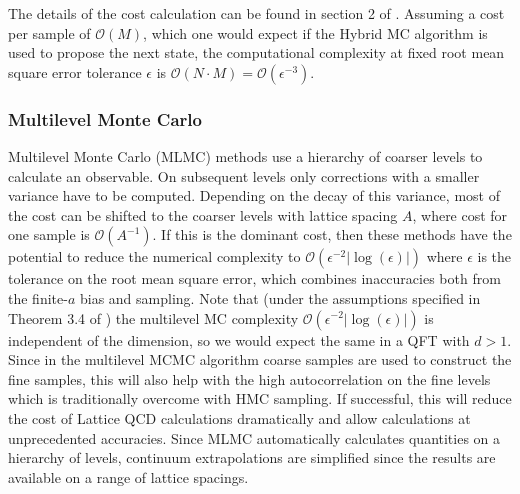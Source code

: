 \documentclass[11pt]{article}
\begin{document}
The details of the cost calculation can be found in section 2 of \cite{Dodwell2015}. Assuming a cost per sample of $\mathcal{O}(M)$, which one would expect if the Hybrid MC algorithm is used to propose the next state, the computational complexity at fixed root mean square error tolerance $\epsilon$ is $\mathcal{O}(N\cdot M)=\mathcal{O}(\epsilon^{-3})$.
\subsubsection{Multilevel Monte Carlo}
Multilevel Monte Carlo (MLMC) methods \cite{Heinrich2001,Giles2008,Giles2015} use a hierarchy of coarser levels to calculate an observable. On subsequent levels only corrections with a smaller variance have to be computed. Depending on the decay of this variance, most of the cost can be shifted to the coarser levels with lattice spacing $A$, where cost for one sample is $\mathcal{O}(A^{-1})$. If this is the dominant cost, then these methods have the potential to reduce the numerical complexity to $\mathcal{O}(\epsilon^{-2}|\log(\epsilon)|)$ where $\epsilon$ is the tolerance on the root mean square error, which combines inaccuracies both from the finite-$a$ bias and sampling. Note that (under the assumptions specified in Theorem 3.4 of \cite{Dodwell2015}) the multilevel MC complexity $\mathcal{O}(\epsilon^{-2}|\log(\epsilon)|)$ is independent of the dimension, so we would expect the same in a QFT with $d>1$. Since in the multilevel MCMC algorithm \cite{Dodwell2015} coarse samples are used to construct the fine samples, this will also help with the high autocorrelation on the fine levels which is traditionally overcome with HMC sampling. If successful, this will reduce the cost of Lattice QCD calculations dramatically and allow calculations at unprecedented accuracies. Since MLMC automatically calculates quantities on a hierarchy of levels, continuum extrapolations are simplified since the results are available on a range of lattice spacings.
\end{document}
